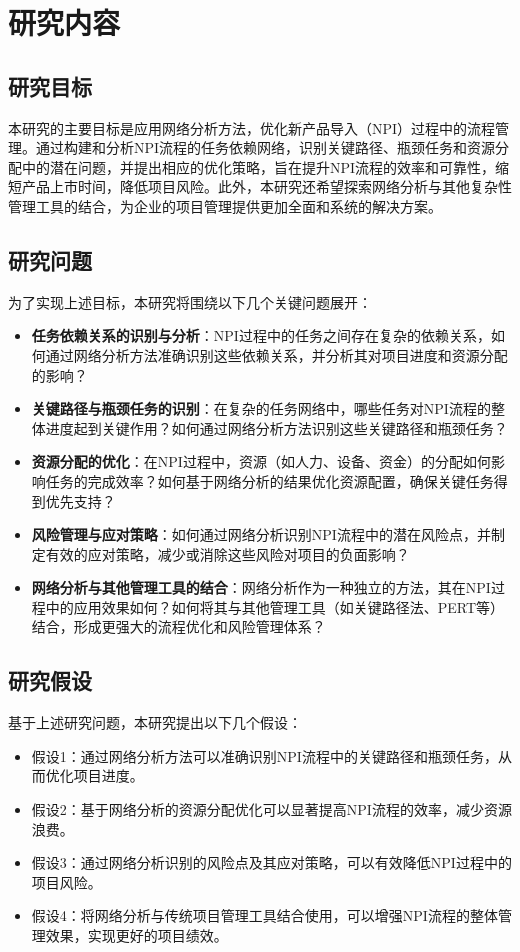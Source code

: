 \chapter{研究内容}

\section{研究目标}
本研究的主要目标是应用网络分析方法，优化新产品导入（NPI）过程中的流程管理。通过构建和分析NPI流程的任务依赖网络，识别关键路径、瓶颈任务和资源分配中的潜在问题，并提出相应的优化策略，旨在提升NPI流程的效率和可靠性，缩短产品上市时间，降低项目风险。此外，本研究还希望探索网络分析与其他复杂性管理工具的结合，为企业的项目管理提供更加全面和系统的解决方案。

\section{研究问题}
为了实现上述目标，本研究将围绕以下几个关键问题展开：
\begin{itemize}
    \item \textbf{任务依赖关系的识别与分析}：NPI过程中的任务之间存在复杂的依赖关系，如何通过网络分析方法准确识别这些依赖关系，并分析其对项目进度和资源分配的影响？
    \item \textbf{关键路径与瓶颈任务的识别}：在复杂的任务网络中，哪些任务对NPI流程的整体进度起到关键作用？如何通过网络分析方法识别这些关键路径和瓶颈任务？
    \item \textbf{资源分配的优化}：在NPI过程中，资源（如人力、设备、资金）的分配如何影响任务的完成效率？如何基于网络分析的结果优化资源配置，确保关键任务得到优先支持？
    \item \textbf{风险管理与应对策略}：如何通过网络分析识别NPI流程中的潜在风险点，并制定有效的应对策略，减少或消除这些风险对项目的负面影响？
    \item \textbf{网络分析与其他管理工具的结合}：网络分析作为一种独立的方法，其在NPI过程中的应用效果如何？如何将其与其他管理工具（如关键路径法、PERT等）结合，形成更强大的流程优化和风险管理体系？
\end{itemize}

\section{研究假设}
基于上述研究问题，本研究提出以下几个假设：
\begin{itemize}
    \item 假设1：通过网络分析方法可以准确识别NPI流程中的关键路径和瓶颈任务，从而优化项目进度。
    \item 假设2：基于网络分析的资源分配优化可以显著提高NPI流程的效率，减少资源浪费。
    \item 假设3：通过网络分析识别的风险点及其应对策略，可以有效降低NPI过程中的项目风险。
    \item 假设4：将网络分析与传统项目管理工具结合使用，可以增强NPI流程的整体管理效果，实现更好的项目绩效。
\end{itemize}

